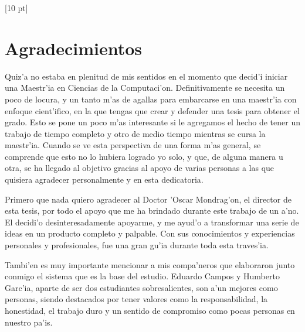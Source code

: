 \titleformat{\chapter}{\Huge\bfseries}{\thechapter}{0 pt}{\rule{340 pt}{3 pt}\\}
\titlespacing{\chapter}{100 pt}{-25 pt}{40 pt}[10 pt]	
\pagestyle{fancy}
\fancyhead[RO,RE]{\thepage}
\fancyfoot[CO,CE]{}

\chapter*{Agradecimientos}

\normalsize
\noindent 
Quiz'a no estaba en plenitud de mis sentidos en el momento que decid'i iniciar una Maestr'ia en Ciencias de la Computaci'on. Definitivamente se necesita un poco de locura, y un tanto m'as de agallas para embarcarse en una maestr'ia con enfoque cient'ifico, en la que tengas que crear y defender una tesis para obtener el grado. Esto se pone un poco m'as interesante si le agregamos el hecho de tener un trabajo de tiempo completo y otro de medio tiempo mientras se cursa la maestr'ia. Cuando se ve esta perspectiva de una forma m'as general, se comprende que esto no lo hubiera logrado yo solo, y que, de alguna manera u otra, se ha llegado al objetivo gracias al apoyo de varias personas a las que quisiera agradecer personalmente y en esta dedicatoria.

Primero que nada quiero agradecer al Doctor 'Oscar Mondrag'on, el director de esta tesis, por todo el apoyo que me ha brindado durante este trabajo de un a'no. El decidi'o desinteresadamente apoyarme, y me ayud'o a transformar una serie de ideas en un producto completo y palpable. Con sus conocimientos y experiencias personales y profesionales, fue una gran gu'ia durante toda esta traves'ia.

Tambi'en es muy importante mencionar a mis compa'neros que elaboraron junto conmigo el sistema que es la base del estudio. Eduardo Campos y Humberto Garc'ia, aparte de ser dos estudiantes sobresalientes, son a'un mejores como personas, siendo destacados por tener valores como la responsabilidad, la honestidad, el trabajo duro y un sentido de compromiso como pocas personas en nuestro pa'is.

